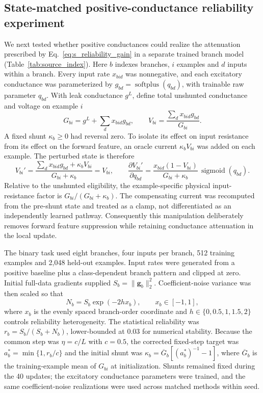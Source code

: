 \subsection{State-matched positive-conductance reliability experiment}

We next tested whether positive conductances could realize the attenuation
prescribed by Eq.~\ref{eq:s_reliability_gain} in a separate trained branch
model (Table~\ref{tab:source_index}). Here $b$ indexes branches, $i$ examples and $d$ inputs within a branch. Every
input rate $x_{bid}$ was nonnegative, and each excitatory conductance was
parameterized by $g_{bd}=\operatorname{softplus}(q_{bd})$, with trainable
raw parameter $q_{bd}$. With leak conductance $g^L$, define total unshunted
conductance and voltage on example $i$
\begin{equation}
G_{bi}=g^L+\sum_d x_{bid}g_{bd},\qquad
V_{bi}=\frac{\sum_d x_{bid}g_{bd}}{G_{bi}}.
\label{eq:s_positive_branch_voltage}
\end{equation}
A fixed shunt $\kappa_b\geq0$ had reversal zero. To isolate its effect on
input resistance from its effect on the forward feature, an oracle current
$\kappa_bV_{bi}$ was added on each example. The perturbed state is therefore
\begin{equation}
V_{bi}'=\frac{\sum_d x_{bid}g_{bd}+\kappa_bV_{bi}}{G_{bi}+\kappa_b}=V_{bi},
\qquad
\frac{\partial V_{bi}'}{\partial q_{bd}}
=\frac{x_{bid}(1-V_{bi})}{G_{bi}+\kappa_b}\,
\operatorname{sigmoid}(q_{bd}).
\label{eq:s_state_matched_shunt}
\end{equation}
Relative to the unshunted eligibility, the example-specific physical
input-resistance factor is $G_{bi}/(G_{bi}+\kappa_b)$. The compensating current was recomputed from the
pre-shunt state and treated as a clamp, not differentiated as an independently
learned pathway. Consequently this manipulation deliberately removes forward
feature suppression while retaining conductance attenuation in the local
update.

The binary task used eight branches, four inputs per branch, 512 training
examples and 2,048 held-out examples. Input rates were generated from a
positive baseline plus a class-dependent branch pattern and clipped at zero.
Initial full-data gradients supplied
$S_b=\lVert\bm g_b\rVert_2^2$. Coefficient-noise variance was then scaled so
that
\begin{equation}
N_b=S_b\exp(-2h x_b),\qquad x_b\in[-1,1],
\end{equation}
where $x_b$ is the evenly spaced branch-order coordinate and
$h\in\{0,0.5,1,1.5,2\}$ controls reliability heterogeneity. The statistical reliability was
$r_b=S_b/(S_b+N_b)$, lower-bounded at 0.03 for numerical stability. Because
the common step was $\eta=c/L$ with $c=0.5$, the corrected fixed-step target
was $a_b^*=\min\{1,r_b/c\}$ and the initial shunt was
$\kappa_b=\overline G_b[(a_b^*)^{-1}-1]$, where $\overline G_b$ is the
training-example mean of $G_{bi}$ at initialization. Shunts remained fixed during the 40
updates; the excitatory conductance parameters were trained, and the same
coefficient-noise realizations were used across matched methods within seed.


